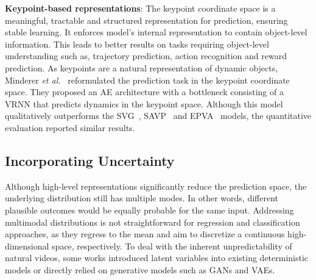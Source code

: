 \vspace*{0.1cm}\noindent\textbf{Keypoint-based representations}: The keypoint coordinate space is a meaningful, tractable and structured representation for prediction, ensuring stable learning. It enforces model's internal representation to contain object-level information. This leads to better results on tasks requiring object-level understanding such as, trajectory prediction, action recognition and reward prediction. As keypoints are a natural representation of dynamic objects, Minderer \textit{et al.}~\cite{Minderer2019} reformulated the prediction task in the keypoint coordinate space. They proposed an \ac{AE} architecture with a bottleneck consisting of a \ac{VRNN} that predicts dynamics in the keypoint space. Although this model qualitatively outperforms the \ac{SVG}~\cite{Denton2018}, \ac{SAVP}~\cite{Lee2018} and \ac{EPVA}~\cite{Wichers2018} models, the quantitative evaluation reported similar results.

\subsection{Incorporating Uncertainty}
\label{subsec:m_uncertainty}
Although high-level representations significantly reduce the prediction space, the underlying distribution still has multiple modes. In other words, different plausible outcomes would be equally probable for the same input. Addressing multimodal distributions is not straightforward for regression and classification approaches, as they regress to the mean and aim to discretize a continuous high-dimensional space, respectively. To deal with the inherent unpredictability of natural videos, some works introduced latent variables into existing deterministic models or directly relied on generative models such as \acp{GAN} and \acp{VAE}.

